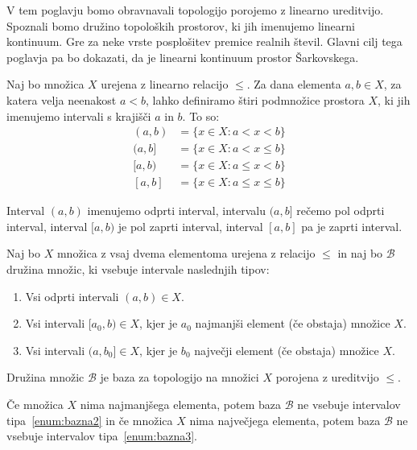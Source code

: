 \documentclass[../TG_magistrsko_delo_sections.tex]{subfiles}
\begin{document}
V tem poglavju bomo obravnavali topologijo porojemo z linearno ureditvijo. Spoznali bomo družino topoloških prostorov, ki jih imenujemo linearni kontinuum. Gre za neke vrste posplošitev premice realnih števil. Glavni cilj tega poglavja pa bo dokazati, da je linearni kontinuum prostor Šarkovskega.

Naj bo množica $X$ urejena z linearno relacijo $\leq$. Za dana elementa $a, b \in X$, za katera velja neenakost $a<b$, lahko definiramo štiri podmnožice prostora $X$, ki jih imenujemo intervali s krajišči $a$ in $b$. To so:
\begin{equation*} %
\begin{split}
(a, b) &= \{x \in X: a< x <b\} \\ 
(a, b] &= \{x \in X: a< x \leq b\} \\ 
[a, b) &= \{x \in X: a \leq x< b\} \\ 
[a, b] &= \{x \in X: a \leq x \leq b\}
\end{split}
\end{equation*}

\begin{opomba}\label{op:intervali}
Interval $(a, b)$ imenujemo odprti interval, intervalu $(a, b]$ rečemo pol odprti interval, interval $[a, b)$ je pol zaprti interval, interval $[a, b]$ pa je zaprti interval.
\end{opomba}

\begin{definicija}
Naj bo $X$ množica z vsaj dvema elementoma urejena z relacijo $\leq$ in naj bo $\mathcal{B}$ družina množic, ki vsebuje intervale naslednjih tipov:
\begin{enumerate}
\item Vsi odprti intervali $(a, b) \in X$. \label{enum:bazna1}
\item Vsi intervali $[a_0, b) \in X$, kjer je $a_0$ najmanjši element (če obstaja) množice $X$. \label{enum:bazna2}
\item Vsi intervali $(a, b_0] \in X$, kjer je $b_0$ največji element (če obstaja) množice $X$. \label{enum:bazna3}
\end{enumerate}
Družina množic $\mathcal{B}$ je baza za topologijo na množici $X$ porojena z ureditvijo $\leq$.
\end{definicija}

\begin{opomba}\label{op:ekstremi}
Če množica $X$ nima najmanjšega elementa, potem baza $\mathcal{B}$ ne vsebuje intervalov tipa~\ref{enum:bazna2} in če množica $X$ nima največjega elementa, potem baza $\mathcal{B}$ ne vsebuje intervalov tipa~\ref{enum:bazna3}.
\end{opomba}
\end{document}
